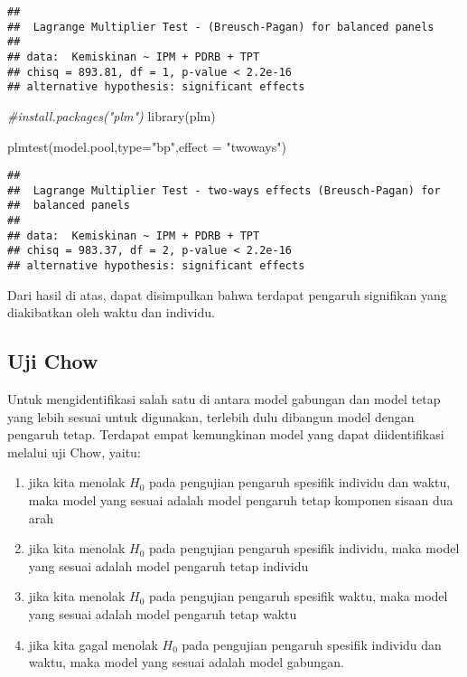 \documentclass[
]{book}
\newenvironment{Shaded}{\begin{snugshade}}{\end{snugshade}}
\newcommand{\AttributeTok}[1]{\textcolor[rgb]{0.77,0.63,0.00}{#1}}
\newcommand{\CommentTok}[1]{\textcolor[rgb]{0.56,0.35,0.01}{\textit{#1}}}
\newcommand{\FunctionTok}[1]{\textcolor[rgb]{0.00,0.00,0.00}{#1}}
\newcommand{\NormalTok}[1]{#1}
\newcommand{\StringTok}[1]{\textcolor[rgb]{0.31,0.60,0.02}{#1}}
\begin{document}
\begin{verbatim}
## 
##  Lagrange Multiplier Test - (Breusch-Pagan) for balanced panels
## 
## data:  Kemiskinan ~ IPM + PDRB + TPT
## chisq = 893.81, df = 1, p-value < 2.2e-16
## alternative hypothesis: significant effects
\end{verbatim}

\begin{Shaded}
\begin{Highlighting}[]
\CommentTok{\#install.packages("plm")}
\FunctionTok{library}\NormalTok{(plm)}

\FunctionTok{plmtest}\NormalTok{(model.pool,}\AttributeTok{type=}\StringTok{"bp"}\NormalTok{,}\AttributeTok{effect =} \StringTok{"twoways"}\NormalTok{)}
\end{Highlighting}
\end{Shaded}

\begin{verbatim}
## 
##  Lagrange Multiplier Test - two-ways effects (Breusch-Pagan) for
##  balanced panels
## 
## data:  Kemiskinan ~ IPM + PDRB + TPT
## chisq = 983.37, df = 2, p-value < 2.2e-16
## alternative hypothesis: significant effects
\end{verbatim}

Dari hasil di atas, dapat disimpulkan bahwa terdapat pengaruh signifikan yang diakibatkan oleh waktu dan individu.

\hypertarget{uji-chow}{%
\subsection{Uji Chow}\label{uji-chow}}

Untuk mengidentifikasi salah satu di antara model gabungan dan model tetap yang lebih sesuai untuk digunakan, terlebih dulu dibangun model dengan pengaruh tetap. Terdapat empat kemungkinan model yang dapat diidentifikasi melalui uji Chow, yaitu:

\begin{enumerate}
\def\labelenumi{(\arabic{enumi})}
\item
  jika kita menolak \(H_0\) pada pengujian pengaruh spesifik individu dan waktu, maka model yang sesuai adalah model pengaruh tetap komponen sisaan dua arah
\item
  jika kita menolak \(H_0\) pada pengujian pengaruh spesifik individu, maka model yang sesuai adalah model pengaruh tetap individu
\item
  jika kita menolak \(H_0\) pada pengujian pengaruh spesifik waktu, maka model yang sesuai adalah model pengaruh tetap waktu
\item
  jika kita gagal menolak \(H_0\) pada pengujian pengaruh spesifik individu dan waktu, maka model yang sesuai adalah model gabungan.
\end{enumerate}
\end{document}
